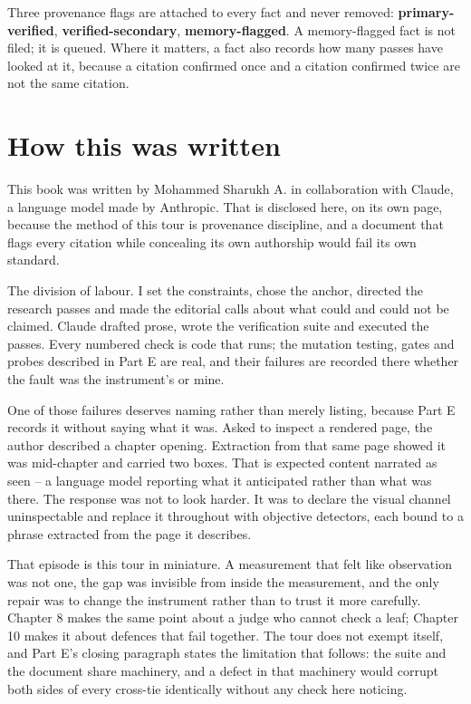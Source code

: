 Three provenance flags are attached to every fact and never removed: \textbf{primary-verified}, \textbf{verified-secondary}, \textbf{memory-flagged}. A memory-flagged fact is not filed; it is queued. Where it matters, a fact also records how many passes have looked at it, because a citation confirmed once and a citation confirmed twice are not the same citation.

\chapter*{How this was written}

This book was written by Mohammed Sharukh A. in collaboration with Claude, a language model made by Anthropic. That is disclosed here, on its own page, because the method of this tour is provenance discipline, and a document that flags every citation while concealing its own authorship would fail its own standard.

The division of labour. I set the constraints, chose the anchor, directed the research passes and made the editorial calls about what could and could not be claimed. Claude drafted prose, wrote the verification suite and executed the passes. Every numbered check is code that runs; the mutation testing, gates and probes described in Part E are real, and their failures are recorded there whether the fault was the instrument's or mine.

One of those failures deserves naming rather than merely listing, because Part E records it without saying what it was. Asked to inspect a rendered page, the author described a chapter opening. Extraction from that same page showed it was mid-chapter and carried two boxes. That is expected content narrated as seen -- a language model reporting what it anticipated rather than what was there. The response was not to look harder. It was to declare the visual channel uninspectable and replace it throughout with objective detectors, each bound to a phrase extracted from the page it describes.

That episode is this tour in miniature. A measurement that felt like observation was not one, the gap was invisible from inside the measurement, and the only repair was to change the instrument rather than to trust it more carefully. Chapter 8 makes the same point about a judge who cannot check a leaf; Chapter 10 makes it about defences that fail together. The tour does not exempt itself, and Part E's closing paragraph states the limitation that follows: the suite and the document share machinery, and a defect in that machinery would corrupt both sides of every cross-tie identically without any check here noticing.

